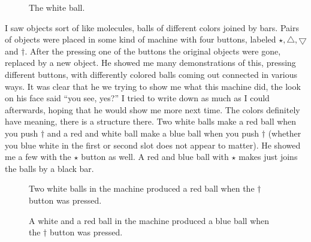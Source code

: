 \documentclass[12pt]{article}
\newcommand{\gcd}{\operatorname{gcd}}
\def\gcd{\bigtriangledown}
\def\lcm{\bigtriangleup}
\begin{document}
\begin{figure}
\centering
{}
\caption{The white ball.}
\end{figure}

I saw objects sort of like molecules, balls of different colors joined by bars.   Pairs of objects were placed in
some kind of machine with four buttons, labeled $\star, \lcm, \gcd$ and $\dagger$.  After the pressing one of the buttons the original
objects were gone, replaced by a new object.  He showed me many demonstrations of this, pressing different buttons, with differently colored balls coming out
connected in various ways.  It was clear that he we trying to show me what this machine did, the look on his face said ``you see, yes?''  I tried to write down as much
as I could afterwards, hoping that he would show me more next time.  The colors definitely have meaning, there is a structure there.  Two white balls
make a red ball when you push $\dagger$ and a red and white ball make a blue ball when you push $\dagger$ (whether you blue white in the first or second slot
does not appear to matter).  He showed me a few with the $\star$ button as well.  A red and blue ball with $\star$ makes just joins the balls by a black bar.  
\begin{figure}
\centering
{}
\caption{Two white balls in the machine produced a red ball when the $\dagger$ button was pressed.}
\end{figure}

\begin{figure}
\centering
{}
\caption{A white and a red ball in the machine produced a blue ball when the $\dagger$ button was pressed.}
\end{figure}
\end{document}
